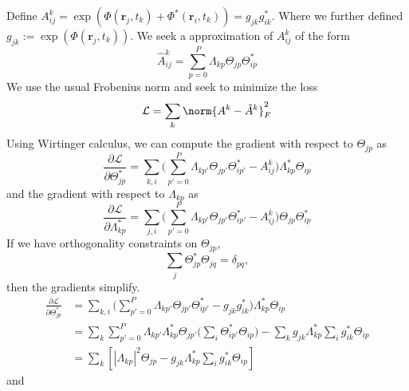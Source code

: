 \documentclass{article}
\begin{document}
Define $A^k_{ij} = \exp(\Phi(\mathbf{r}_j, t_k) + \Phi^*(\mathbf{r}_i, t_k)) = g_{jk} g^*_{ik}$. Where we further
defined $g_{jk} := \exp(\Phi(\mathbf{r}_j, t_k))$. 
We seek a approximation of $A^k_{ij}$ of the form
\begin{equation}
    \hat{A}^k_{ij} = \sum_{p=0}^P \Lambda_{kp} \Theta_{jp} \Theta^*_{ip}
\end{equation}
We use the usual Frobenius norm and seek to minimize the loss
\begin{equation}
    \mathcal{L} = \sum_k \norm{A^k - \hat{A}^k}_F^2
\end{equation}
Using Wirtinger calculus, we can compute the gradient with respect to $\Theta_{jp}$ as
\begin{equation}
    \frac{\partial \mathcal{L}}{\partial \Theta_{jp}^*} = \sum_{k,i}\bigg(\sum_{p' = 0}^P \Lambda_{kp'} \Theta_{jp'} \Theta^*_{ip'} - A^k_{ij}\bigg)\Lambda_{kp}^* \Theta_{ip}
\end{equation}
and the gradient with respect to $\Lambda_{kp}$ as
\begin{equation}
    \frac{\partial \mathcal{L}}{\partial \Lambda_{kp}^*} = \sum_{j,i}\bigg(\sum_{p' = 0}^P \Lambda_{kp'} \Theta_{jp'} \Theta^*_{ip'} - A^k_{ij}\bigg)\Theta_{jp} \Theta^*_{ip}
\end{equation}
If we have orthogonality constraints on $\Theta_{jp}$, 
\begin{equation}
    \sum_j \Theta^*_{jp} \Theta_{jq} = \delta_{pq},
\end{equation}
then the gradients simplify.
\begin{equation}
\begin{split}
    \frac{\partial \mathcal{L}}{\partial \Theta_{jp}^*} 
    &= \sum_{k,i}\bigg(\sum_{p'=0}^P \Lambda_{kp'} \Theta_{jp'} \Theta^*_{ip'} - g_{jk} g^*_{ik}\bigg)\Lambda_{kp}^* \Theta_{ip} 
    \\
    &= \sum_k\sum_{p'=0}^P \Lambda_{kp'} \Lambda_{kp}^* \Theta_{jp'}\bigg(\sum_i \Theta^*_{ip'}\Theta_{ip}\bigg)
      - \sum_k g_{jk}\Lambda_{kp}^* \sum_i g^*_{ik} \Theta_{ip} 
    \\
    &= \sum_k \left[|\Lambda_{kp}|^2 \Theta_{jp} - g_{jk}\Lambda_{kp}^* \sum_i g^*_{ik} \Theta_{ip} \right]
\end{split}
\end{equation}
and
\end{document}
